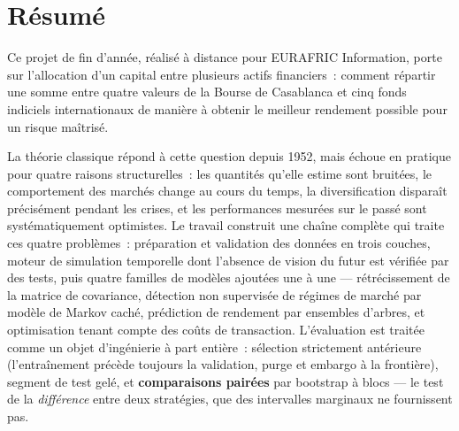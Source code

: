 %

\chapter*{Résumé}

Ce projet de fin d'année, réalisé à distance pour EURAFRIC Information, porte sur
l'allocation d'un capital entre plusieurs actifs financiers~: comment répartir
une somme entre quatre valeurs de la Bourse de Casablanca et cinq fonds
indiciels internationaux de manière à obtenir le meilleur rendement possible pour
un risque maîtrisé.

La théorie classique répond à cette question depuis 1952, mais échoue en pratique
pour quatre raisons structurelles~: les quantités qu'elle estime sont bruitées,
le comportement des marchés change au cours du temps, la diversification
disparaît précisément pendant les crises, et les performances mesurées sur le
passé sont systématiquement optimistes. Le travail construit une chaîne complète
qui traite ces quatre problèmes~: préparation et validation des données en trois
couches, moteur de simulation temporelle dont l'absence de vision du futur est
vérifiée par des tests, puis quatre familles de modèles ajoutées une à une —
rétrécissement de la matrice de covariance, détection non supervisée de régimes
de marché par modèle de Markov caché, prédiction de rendement par ensembles
d'arbres, et optimisation tenant compte des coûts de transaction. L'évaluation
est traitée comme un objet d'ingénierie à part entière~: sélection strictement
antérieure (l'entraînement précède toujours la validation, purge et embargo à la
frontière), segment de test gelé, et \textbf{comparaisons pairées} par bootstrap
à blocs — le test de la \emph{différence} entre deux stratégies, que des
intervalles marginaux ne fournissent pas.

